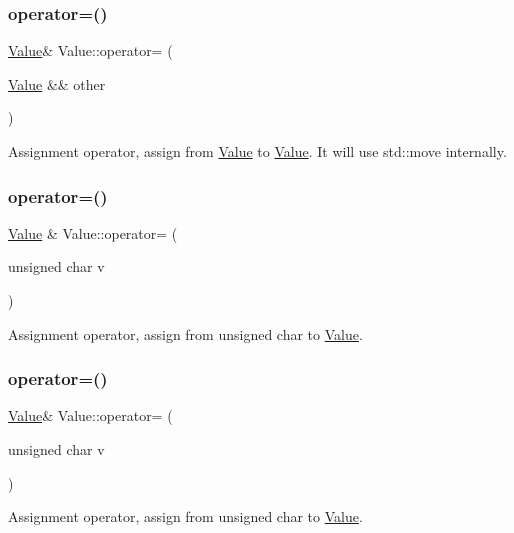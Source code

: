 \subsubsection{\texorpdfstring{operator=()}{operator=()}\hspace{0.1cm}{\footnotesize\ttfamily [4/32]}}
{\footnotesize\ttfamily \hyperlink{classValue}{Value}\& Value\+::operator= (\begin{DoxyParamCaption}\item[{\hyperlink{classValue}{Value} \&\&}]{other }\end{DoxyParamCaption})}

Assignment operator, assign from \hyperlink{classValue}{Value} to \hyperlink{classValue}{Value}. It will use std\+::move internally. \mbox{\label{classValue_a6ebdc1caa0edbda13f4bf430bb011294}} 
\subsubsection{\texorpdfstring{operator=()}{operator=()}\hspace{0.1cm}{\footnotesize\ttfamily [5/32]}}
{\footnotesize\ttfamily \hyperlink{classValue}{Value} \& Value\+::operator= (\begin{DoxyParamCaption}\item[{unsigned char}]{v }\end{DoxyParamCaption})}

Assignment operator, assign from unsigned char to \hyperlink{classValue}{Value}. \mbox{\label{classValue_a94c5672ff663ae65bb94627188a9796b}} 
\subsubsection{\texorpdfstring{operator=()}{operator=()}\hspace{0.1cm}{\footnotesize\ttfamily [6/32]}}
{\footnotesize\ttfamily \hyperlink{classValue}{Value}\& Value\+::operator= (\begin{DoxyParamCaption}\item[{unsigned char}]{v }\end{DoxyParamCaption})}

Assignment operator, assign from unsigned char to \hyperlink{classValue}{Value}. \mbox{\label{classValue_a159c0ef7a1c285a39b5719d0eed34109}} 

